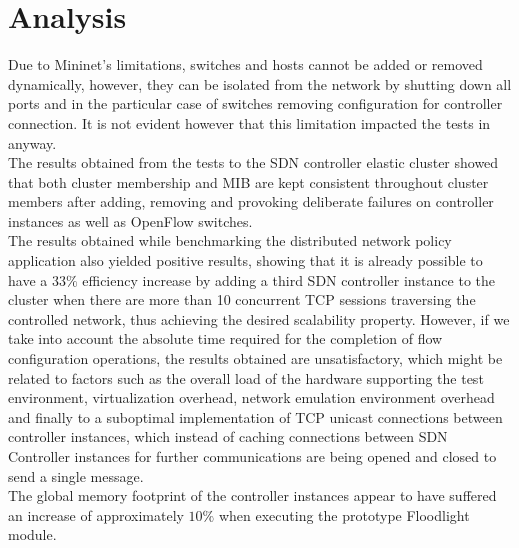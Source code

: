 \section{Analysis}
\label{section:considerations}
Due to Mininet's limitations, switches and hosts cannot be added or removed dynamically, however, they can be isolated from the network by shutting down all ports and in the particular case of switches removing configuration for controller connection.
It is not evident however that this limitation impacted the tests in anyway.\\
%
The results obtained from the tests to the \gls{SDN} controller elastic cluster showed that both cluster membership and \gls{MIB} are kept consistent throughout cluster members after adding, removing and provoking deliberate failures on controller instances as well as OpenFlow switches.\\
%
The results obtained while benchmarking the distributed network policy application also yielded positive results, showing that it is already possible to have a 33$\%$ efficiency increase by adding a third \gls{SDN} controller instance to the cluster when there are more than 10 concurrent \gls{TCP} sessions traversing the controlled network, thus achieving the desired scalability property.
However, if we take into account the absolute time required for the completion of flow configuration operations, the results obtained are unsatisfactory, which might be related to factors such as the overall load of the hardware supporting the test environment, virtualization overhead, network emulation environment overhead and finally to a suboptimal implementation of \gls{TCP} unicast connections between controller instances, which instead of caching connections between \gls{SDN} Controller instances for further communications are being opened and closed to send a single message.\\
The global memory footprint of the controller instances appear to have suffered an increase of approximately $10\%$ when executing the prototype Floodlight module.
